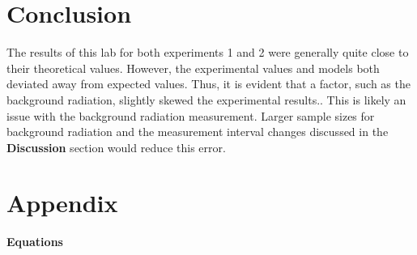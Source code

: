 \documentclass[
	letterpaper, %
	10pt, %
]{CSUniSchoolLabReport}
\begin{document}
\section{Conclusion}
\vspace{20pt}
The results of this lab for both experiments 1 and 2 were generally quite close to their theoretical values.
However, the experimental values and models both deviated away from expected values. Thus, it is evident that a factor, such as the background radiation, slightly skewed the experimental results.. This is likely an issue with the background radiation measurement. Larger
sample sizes for background radiation and the measurement interval changes discussed in the \textbf{Discussion}
section would reduce this error.

\vspace{20pt}
\section{Appendix}
\vspace{20pt}
{\Large\textbf{Equations}}\\
\end{document}

